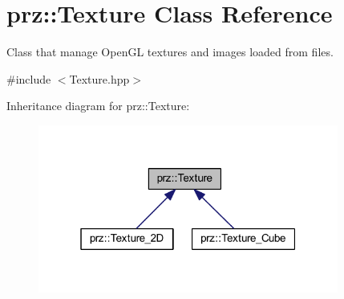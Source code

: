 \hypertarget{classprz_1_1_texture}{}\section{prz\+::Texture Class Reference}
\label{classprz_1_1_texture}


Class that manage Open\+GL textures and images loaded from files.  




{\ttfamily \#include $<$Texture.\+hpp$>$}



Inheritance diagram for prz\+::Texture\+:
\nopagebreak
\begin{figure}[H]
\begin{center}
\leavevmode
\includegraphics[width=280pt]{classprz_1_1_texture__inherit__graph}
\end{center}
\end{figure}
